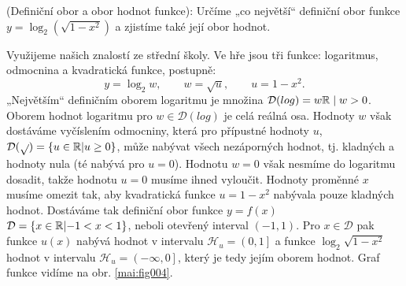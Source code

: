 \begin{mdframed}[style=mdexam]
  \begin{example}\label{MAI:exam017}
    (Definiční obor a obor hodnot funkce): Určíme „co největší“ definiční obor funkce
    \(y=\log_2{(\sqrt{1-x^2})}\) a zjistíme také její obor hodnot.
        
    {\centering
    \captionsetup{type=figure}
    \par}
    
    Využijeme našich znalostí ze střední školy. Ve hře jsou tři funkce: logaritmus, odmocnina a
    kvadratická funkce, postupně: 
    \begin{equation*}
      y = \log_2w, \qquad w = \sqrt{u}, \qquad u = 1 - x^2.
    \end{equation*}
    „Největším“ definičním oborem logaritmu je množina \(\mathcal{D}(log) = {w\mathbb{R} \mid w >
    0}\). Oborem hodnot logaritmu pro \(w \in \mathcal{D}(log)\) je celá reálná osa. Hodnoty \(w\)
    však dostáváme vyčíslením odmocniny, která pro přípustné hodnoty \(u\), \(\mathcal{D}(\sqrt{ })
    = \lbrace u\in\mathbb{R} \lvert u\geq 0\rbrace\), může nabývat všech nezáporných hodnot, tj.
    kladných a hodnoty nula (té nabývá pro \(u = 0\)). Hodnotu \(w = 0\) však nesmíme do logaritmu
    dosadit, takže hodnotu \(u = 0\) musíme ihned vyloučit. Hodnoty proměnné \(x\) musíme omezit
    tak, aby kvadratická funkce \(u = 1 - x^2\) nabývala pouze kladných hodnot. Dostáváme tak
    definiční obor funkce \(y = f(x)\) \(\mathcal{D}=\lbrace x\in\mathbb{R} \lvert -1<x<1\rbrace\),
    neboli otevřený interval \((-1, 1)\). Pro \(x \in \mathcal{D}\) pak funkce \(u(x)\) nabývá
    hodnot v intervalu \(\mathcal{H}_u = \left( 0, 1\right]\) a funkce \(\log_2\sqrt{1-x^2}\) hodnot
    v intervalu \(\mathcal{H}_u = \left( -\infty, 0\right]\), který je tedy jejím oborem hodnot.
    Graf funkce vidíme na obr. \ref{mai:fig004}. 
  \end{example}
\end{mdframed}